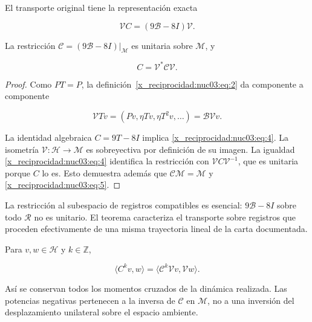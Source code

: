 \begin{theorem}
\label{x_reciprocidad:nuc03:transporte}
El transporte original tiene la representación exacta

\begin{equation}
\boxed{\mathcal V C=(9\mathcal B-8I)\mathcal V.}
\label{x_reciprocidad:nuc03:eq:4}
\end{equation}

La restricción \(\mathcal C=(9\mathcal B-8I)|_{\mathcal M}\) es unitaria sobre \(\mathcal M\), y

\begin{equation}
C=\mathcal V^*\mathcal C\mathcal V.
\label{x_reciprocidad:nuc03:eq:5}
\end{equation}
\end{theorem}

\begin{proof}
Como \(PT=P\), la definición~\eqref{x_reciprocidad:nuc03:eq:2} da componente a componente

\[
\mathcal VT v=(Pv,\eta Tv,\eta T^2v,\ldots)=\mathcal B\mathcal Vv.
\]

La identidad algebraica \(C=9T-8I\) implica \eqref{x_reciprocidad:nuc03:eq:4}. La isometría \(\mathcal V:\mathcal H\to\mathcal M\) es sobreyectiva por definición de su imagen. La igualdad \eqref{x_reciprocidad:nuc03:eq:4} identifica la restricción con \(\mathcal V C\mathcal V^{-1}\), que es unitaria porque \(C\) lo es. Esto demuestra además que \(\mathcal C\mathcal M=\mathcal M\) y \eqref{x_reciprocidad:nuc03:eq:5}.
\end{proof}

La restricción al subespacio de registros compatibles es esencial: \(9\mathcal B-8I\) sobre todo \(\mathcal R\) no es unitario. El teorema caracteriza el transporte sobre registros que proceden efectivamente de una misma trayectoria lineal de la carta documentada.

\begin{corollary}
Para \(v,w\in\mathcal H\) y \(k\in\mathbb Z\),

\begin{equation}
\langle C^kv,w\rangle
=\langle\mathcal C^k\mathcal Vv,\mathcal Vw\rangle.
\label{x_reciprocidad:nuc03:eq:6}
\end{equation}

Así se conservan todos los momentos cruzados de la dinámica realizada. Las potencias negativas pertenecen a la inversa de \(\mathcal C\) en \(\mathcal M\), no a una inversión del desplazamiento unilateral sobre el espacio ambiente.
\end{corollary}

